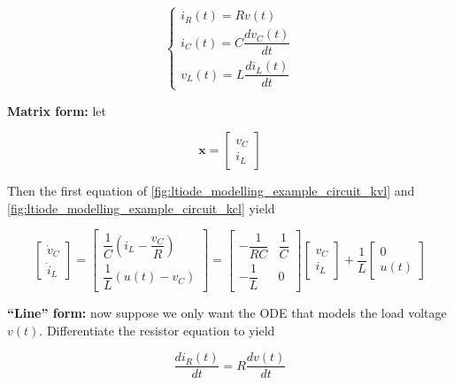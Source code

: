 \begin{example}
\begin{equation}
	\left\{\begin{array}{l}
		i_R(t) = Rv(t) \\[3mm]
		i_C(t) = C \dfrac{dv_C(t)}{dt} \\[3mm]
		v_L(t) = L\dfrac{di_L(t)}{dt}
	\end{array}\right. \label{fig:ltiode_modelling_example_circuit_components_matrix}
\end{equation}

\textbf{Matrix form:} let

\begin{equation} \mathbf{x} = \left[\begin{array}{c} v_C \\[3mm] i_L \end{array}\right] \end{equation}

	Then the first equation of \eqref{fig:ltiode_modelling_example_circuit_kvl} and \eqref{fig:ltiode_modelling_example_circuit_kcl} yield

\begin{equation} \left[\begin{array}{c} \dot{v}_C \\[3mm] \dot{i}_L \end{array}\right] = \left[\begin{array}{c} \dfrac{1}{C} \left(i_L - \dfrac{v_C}{R}\right) \\[3mm] \dfrac{1}{L}\left(u(t) - v_C\right) \end{array}\right] = \left[\begin{array}{cc} -\dfrac{1}{RC} & \dfrac{1}{C} \\[3mm] -\dfrac{1}{L} & 0 \end{array}\right]\left[\begin{array}{c} v_C \\[3mm] i_L \end{array}\right] + \dfrac{1}{L}\left[\begin{array}{c} 0 \\[3mm] u(t)\end{array}\right] \end{equation}

\textbf{``Line'' form:} now suppose we only want the ODE that models the load voltage $v(t)$. Differentiate the resistor equation to yield

\begin{equation} \dfrac{di_R(t)}{dt} = R\dfrac{dv(t)}{dt} \end{equation}


\end{example}
